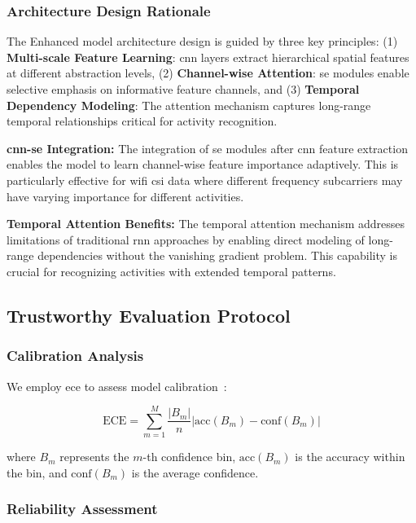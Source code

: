 \documentclass[journal]{IEEEtran}
\begin{document}
\subsubsection{Architecture Design Rationale}

The Enhanced model architecture design is guided by three key principles: (1) \textbf{Multi-scale Feature Learning}: \gls{cnn} layers extract hierarchical spatial features at different abstraction levels, (2) \textbf{Channel-wise Attention}: \gls{se} modules enable selective emphasis on informative feature channels, and (3) \textbf{Temporal Dependency Modeling}: The attention mechanism captures long-range temporal relationships critical for activity recognition.

\textbf{\gls{cnn}-\gls{se} Integration:} The integration of \gls{se} modules after \gls{cnn} feature extraction enables the model to learn channel-wise feature importance adaptively. This is particularly effective for \gls{wifi} \gls{csi} data where different frequency subcarriers may have varying importance for different activities.

\textbf{Temporal Attention Benefits:} The temporal attention mechanism addresses limitations of traditional \gls{rnn} approaches by enabling direct modeling of long-range dependencies without the vanishing gradient problem. This capability is crucial for recognizing activities with extended temporal patterns.

\subsection{Trustworthy Evaluation Protocol}

\subsubsection{Calibration Analysis}

We employ \gls{ece} to assess model calibration~\cite{calibration_guo2017}:

\begin{equation}
\text{ECE} = \sum_{m=1}^{M} \frac{|B_m|}{n} |\text{acc}(B_m) - \text{conf}(B_m)|
\end{equation}

where $B_m$ represents the $m$-th confidence bin, $\text{acc}(B_m)$ is the accuracy within the bin, and $\text{conf}(B_m)$ is the average confidence.

\subsubsection{Reliability Assessment}
\end{document}
